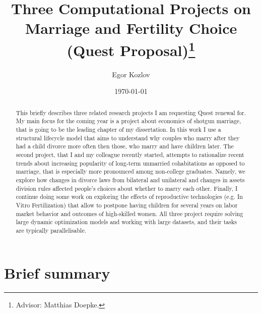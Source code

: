 \documentclass[12pt,letter]{article}
\begin{document}
\title{Three Computational Projects on Marriage and Fertility Choice (Quest Proposal)\footnote{Advisor: Matthias Doepke.}}
\author{Egor Kozlov}
\date{\today}
\maketitle

\begin{abstract}
This briefly describes three related research projects I am requesting Quest renewal for. My main focus for the coming year is a project about economics of shotgun marriage, that is going to be the leading chapter of my dissertation. In this work I use a structural lifecycle model that aims to understand why couples who marry after they had a child divorce more often then those, who marry and have children later. The second project, that I and my colleague recently started, attempts to rationalize recent trends about increasing popularity of long-term unmarried cohabitations as opposed to marriage, that is especially  more pronounced among non-college graduates. Namely, we explore how changes in divorce laws from bilateral and unilateral and changes in assets division rules affected people's choices about whether to marry each other. Finally, I continue doing some work on exploring the effects of reproductive technologies (e.g. In Vitro Fertilization) that allow to postpone having children for several years on labor market behavior and outcomes of high-skilled women. All three project require solving large dynamic optimization models and working with large datasets, and their tasks are typically parallelisable.

\end{abstract}

\section*{Brief summary}
\end{document}
